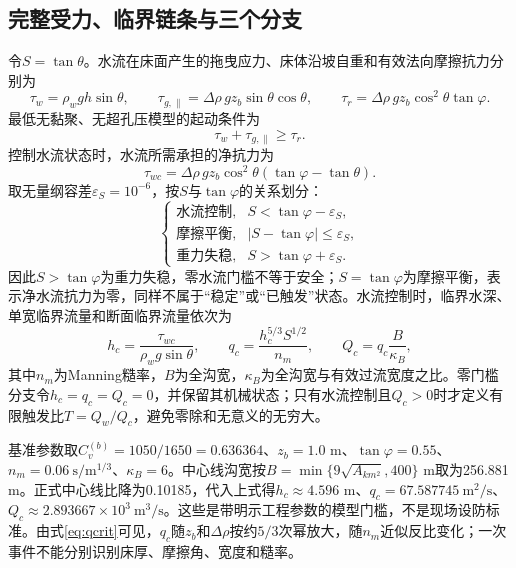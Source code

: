 \subsection{完整受力、临界链条与三个分支}
令$S=\tan\theta$。水流在床面产生的拖曳应力、床体沿坡自重和有效法向摩擦抗力分别为
\begin{equation}
\tau_w=\rho_wgh\sin\theta,\qquad
\tau_{g,\parallel}=\Delta\rho\,gz_b\sin\theta\cos\theta,\qquad
\tau_r=\Delta\rho\,gz_b\cos^2\theta\tan\varphi.
\end{equation}
最低无黏聚、无超孔压模型的起动条件为
\begin{equation}
\tau_w+\tau_{g,\parallel}\ge\tau_r.
\end{equation}
控制水流状态时，水流所需承担的净抗力为
\begin{equation}
\tau_{wc}=\Delta\rho\,gz_b\cos^2\theta
\left(\tan\varphi-\tan\theta\right).
\label{eq:tauwc}
\end{equation}
取无量纲容差$\varepsilon_S=10^{-6}$，按$S$与$\tan\varphi$的关系划分：
\begin{equation}
\begin{cases}
\text{水流控制},&S<\tan\varphi-\varepsilon_S,\\
\text{摩擦平衡},&|S-\tan\varphi|\le\varepsilon_S,\\
\text{重力失稳},&S>\tan\varphi+\varepsilon_S.
\end{cases}
\end{equation}
因此$S>\tan\varphi$为重力失稳，零水流门槛不等于安全；$S=\tan\varphi$为摩擦平衡，表示净水流抗力为零，同样不属于“稳定”或“已触发”状态。水流控制时，临界水深、单宽临界流量和断面临界流量依次为
\begin{equation}
h_c=\frac{\tau_{wc}}{\rho_wg\sin\theta},\qquad
q_c=\frac{h_c^{5/3}S^{1/2}}{n_m},\qquad
Q_c=q_c\frac{B}{\kappa_B},
\label{eq:qcrit}
\end{equation}
其中$n_m$为Manning糙率，$B$为全沟宽，$\kappa_B$为全沟宽与有效过流宽度之比。零门槛分支令$h_c=q_c=Q_c=0$，并保留其机械状态；只有水流控制且$Q_c>0$时才定义有限触发比$T=Q_w/Q_c$，避免零除和无意义的无穷大。

基准参数取$C_v^{(b)}=1050/1650=0.636364$、$z_b=1.0$ m、$\tan\varphi=0.55$、$n_m=0.06\ \mathrm{s/m^{1/3}}$、$\kappa_B=6$。中心线沟宽按$B=\min\{9\sqrt{A_{km^2}},400\}$ m取为256.881 m。正式中心线比降为0.10185，代入上式得$h_c\approx4.596$ m、$q_c=67.587745\ \mathrm{m^2/s}$、$Q_c\approx2.893667\times10^3\ \mathrm{m^3/s}$。这些是带明示工程参数的模型门槛，不是现场设防标准。由式\ref{eq:qcrit}可见，$q_c$随$z_b$和$\Delta\rho$按约$5/3$次幂放大，随$n_m$近似反比变化；一次事件不能分别识别床厚、摩擦角、宽度和糙率。

